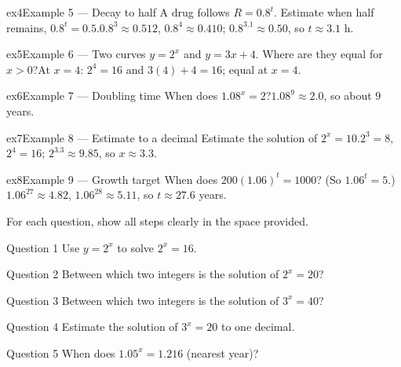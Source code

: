 \documentclass[11pt]{article}
\begin{document}
\begin{example}{ex4}{Example 5 --- Decay to half}
A drug follows $R=0.8^{t}$. Estimate when half remains, $0.8^{t}=0.5$.\soln $0.8^{3}\approx0.512$, $0.8^{4}\approx0.410$; $0.8^{3.1}\approx0.50$, so $t\approx3.1$ h.
\end{example}

\begin{example}{ex5}{Example 6 --- Two curves}
$y=2^{x}$ and $y=3x+4$. Where are they equal for $x>0$?\soln At $x=4$: $2^4=16$ and $3(4)+4=16$; equal at $x=4$.
\end{example}

\begin{example}{ex6}{Example 7 --- Doubling time}
When does $1.08^{x}=2$?\soln $1.08^{9}\approx2.0$, so about $9$ years.
\end{example}

\begin{example}{ex7}{Example 8 --- Estimate to a decimal}
Estimate the solution of $2^{x}=10$.\soln $2^3=8$, $2^4=16$; $2^{3.3}\approx9.85$, so $x\approx3.3$.
\end{example}

\begin{example}{ex8}{Example 9 --- Growth target}
When does $200(1.06)^{t}=1000$? (So $1.06^{t}=5$.)\soln $1.06^{27}\approx4.82$, $1.06^{28}\approx5.11$, so $t\approx27.6$ years.
\end{example}

\clearpage
{}
For each question, show all steps clearly in the space provided.

\begin{qbox}{Question 1}
Use $y=2^{x}$ to solve $2^{x}=16$.\workspace{2.4cm}
\end{qbox}

\begin{qbox}{Question 2}
Between which two integers is the solution of $2^{x}=20$?\workspace{2.4cm}
\end{qbox}

\begin{qbox}{Question 3}
Between which two integers is the solution of $3^{x}=40$?\workspace{2.4cm}
\end{qbox}

\begin{qbox}{Question 4}
Estimate the solution of $3^{x}=20$ to one decimal.\workspace{2.4cm}
\end{qbox}

\begin{qbox}{Question 5}
When does $1.05^{x}=1.216$ (nearest year)?\workspace{2.4cm}
\end{qbox}
\end{document}
